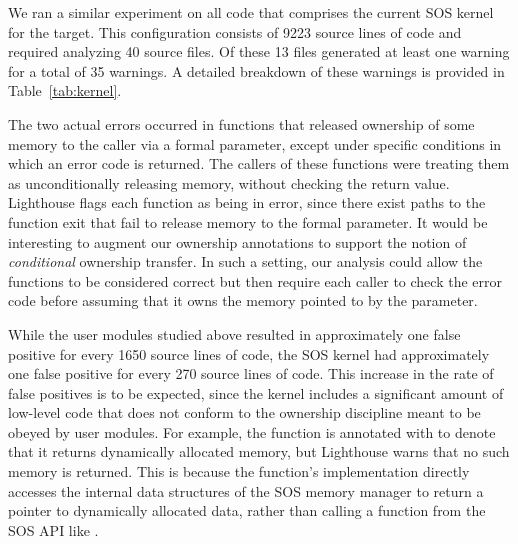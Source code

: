 We ran a similar experiment on all code that comprises the current SOS
kernel for the  target.  
%
This configuration consists of 9223 source lines of code and required
analyzing 40 source files.  
%
Of these 13 files generated at least one warning for a total of 35
warnings.  
%
A detailed breakdown of these warnings is provided in
Table~\ref{tab:kernel}.



The two actual errors occurred in functions that released ownership of
some memory to the caller via a formal parameter, except under specific
conditions in which an error code is returned.
%
The callers of these functions were treating them as unconditionally
releasing memory, without checking the return value.  
%
Lighthouse flags each function as being in error, since there exist
paths to the function exit that fail to release memory to the formal
parameter.  
%
It would be interesting to augment our ownership annotations to support
the notion of {\em conditional} ownership transfer.  
%
In such a setting, our analysis could allow the functions to be
considered correct but then require each caller to check the error code
before assuming that it owns the memory pointed to by the parameter.




While the user modules studied above resulted in approximately one false
positive for every 1650 source lines of code, the SOS kernel had
approximately one false positive for every 270 source lines of code.  
%
This increase in the rate of false positives is to be expected, since
the kernel includes a significant amount of low-level code that does not
conform to the ownership discipline meant to be obeyed by user modules.
%
For example, the function  is annotated with
 to denote that it returns dynamically allocated memory,
but Lighthouse warns that no such memory is returned.  
%
This is because the function's implementation directly accesses the
internal data structures of the SOS memory manager to return a pointer
to dynamically allocated data, rather than calling a function from the
SOS API like .


